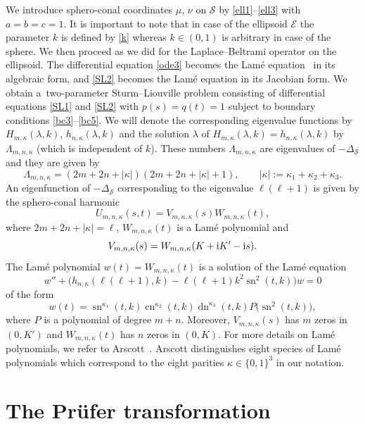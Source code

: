 \documentclass[pdftex]{sigma}
\newcommand{\E}{\mathcal{E}}
\newcommand{\Sp}{\mathcal{S}}
\DeclareMathOperator{\sn}{sn}
\DeclareMathOperator{\cn}{cn}
\DeclareMathOperator{\dn}{dn}
\numberwithin{equation}{section}
\begin{document}
We introduce sphero-conal coordinates $\mu$, $\nu$ on $\Sp$ by \eqref{ell1}--\eqref{ell3} with $a=b=c=1$.
It is important to note that in case of the ellipsoid $\E$ the parameter $k$ is defined by \eqref{k}
whereas $k\in(0,1)$ is arbitrary in case of the sphere.
We then proceed as we did for the Laplace--Beltrami operator on the ellipsoid.
The differential equation \eqref{ode3} becomes the Lam\'e equation~\cite[formula~(29.2.2)]{dlmf} in its algebraic form,
and \eqref{SL2} becomes the Lam\'e equation in its Jacobian form.
We obtain
a~two-parameter Sturm--Liouville problem consisting of differential equations \eqref{SL1} and \eqref{SL2}
with $p(s)=q(t)=1$ subject to boundary conditions \eqref{bc3}--\eqref{bc5}.
We will denote the corresponding eigenvalue functions by $H_{m,\kappa}(\lambda,k)$, $h_{n,\kappa}(\lambda,k)$
and the solution $\lambda$ of $H_{m,\kappa}(\lambda,k)=h_{n,\kappa}(\lambda,k)$ by~$\Lambda_{m,n,\kappa}$ (which is independent of $k$).
These numbers $\Lambda_{m,n,\kappa}$ are eigenvalues of $-\Delta_\Sp$ and they are given by
\begin{equation}\label{Lambda}
 \Lambda_{m,n,\kappa}=(2m+2n+|\kappa|)(2m+2n+|\kappa|+1),\qquad |\kappa|:=\kappa_1+\kappa_2+\kappa_3 .
 \end{equation}
An eigenfunction of $-\Delta_\Sp$ corresponding to the eigenvalue $\ell(\ell+1)$ is given by the sphero-conal harmonic
\begin{equation}\label{harmonic}
 U_{m,n,\kappa}(s,t)=V_{m,n,\kappa}(s)W_{m,n,\kappa}(t),
 \end{equation}
where $2m+2n+|\kappa|=\ell$, $W_{m,n,\kappa}(t)$ is a Lam\'e polynomial and
\[ V_{m,n,\kappa}(s)= W_{m,n,\kappa}(K+{\rm i}K'-{\rm i}s).\]
The Lam\'e polynomial $w(t)=W_{m,n,\kappa}(t)$ is a solution of the Lam\'e equation
\[ w''+\bigl(h_{n,\kappa}(\ell(\ell+1),k)-\ell(\ell+1)k^2 \sn^2(t,k)\bigr) w=0\]
of the form
\[ w(t)=\sn^{\kappa_1}(t,k)\cn^{\kappa_2}(t,k)\dn^{\kappa_3}(t,k) P\bigl(\sn^2(t,k)\bigr),\]
where $P$ is a polynomial of degree $m+n$. Moreover, $V_{m,n,\kappa}(s)$ has $m$ zeros in $(0,K')$ and $W_{m,n,\kappa}(t)$ has $n$ zeros in $(0,K)$.
For more details on Lam\'e polynomials, we refer to Arscott~\mbox{\cite[Chapter~IX]{A}}. Arscott distinguishes eight species of
Lam\'e polynomials which correspond to the eight parities $\kappa\in\{0,1\}^3$ in our notation.

\section{The Pr\"ufer transformation}\label{prufer}
\end{document}

